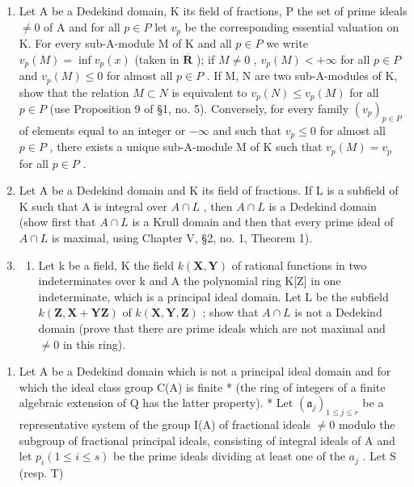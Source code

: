 \begin{enumerate}
\def\labelenumi{\arabic{enumi}.}
\setcounter{enumi}{2}
\item
  Let A be a Dedekind domain, K its field of fractions, P the set of prime ideals \(\neq 0\) of A and for all \(p \in P\) let \(v_{p}\) be the corresponding essential valuation on K. For every sub-A-module M of K and all \(p \in P\) we write \(v_{p}(M) = \inf v_{p}(x)\) (taken in \(\overline{\mathbf{R}}\) ); if \(M \neq 0\) , \(v_{p}(M) < +\infty\) for all \(p \in P\) and \(v_{p}(M) \leqslant 0\) for almost all \(p \in P\) . If M, N are two sub-A-modules of K, show that the relation \(M \subset N\) is equivalent to \(v_{p}(N) \leqslant v_{p}(M)\) for all \(p \in P\) (use Proposition 9 of §1, no. 5). Conversely, for every family \((v_{p})_{p \in P}\) of elements equal to an integer or \(-\infty\) and such that \(v_{p} \leqslant 0\) for almost all \(p \in P\) , there exists a unique sub-A-module M of K such that \(v_{p}(M) = v_{p}\) for all \(p \in P\) .
\item
  Let A be a Dedekind domain and K its field of fractions. If L is a subfield of K such that A is integral over \(A \cap L\) , then \(A \cap L\) is a Dedekind domain (show first that \(A \cap L\) is a Krull domain and then that every prime ideal of \(A \cap L\) is maximal, using Chapter V, §2, no. 1, Theorem 1).
\item
  \begin{enumerate}
  \def\labelenumii{(\alph{enumii})}
  \tightlist
  \item
    Let k be a field, K the field \(k(\mathbf{X}, \mathbf{Y})\) of rational functions in two indeterminates over k and A the polynomial ring K{[}Z{]} in one indeterminate, which is a principal ideal domain. Let L be the subfield \(k(\mathbf{Z}, \mathbf{X} + \mathbf{Y}\mathbf{Z})\) of \(k(\mathbf{X}, \mathbf{Y}, \mathbf{Z})\) ; show that \(A \cap L\) is not a Dedekind domain (prove that there are prime ideals which are not maximal and \(\neq 0\) in this ring).
  \end{enumerate}
\end{enumerate}

\begin{enumerate}
\def\labelenumi{(\alph{enumi})}
\setcounter{enumi}{1}
\tightlist
\item
  Let A be a Dedekind domain which is not a principal ideal domain and for which the ideal class group C(A) is finite * (the ring of integers of a finite algebraic extension of Q has the latter property). * Let \((\mathfrak{a}_{j})_{1 \leqslant j \leqslant r}\) be a representative system of the group I(A) of fractional ideals \(\neq 0\) modulo the subgroup of fractional principal ideals, consisting of integral ideals of A and let \(p_{i} (1 \leqslant i \leqslant s)\) be the prime ideals dividing at least one of the \(a_{j}\) . Let S (resp. T)
\end{enumerate}

